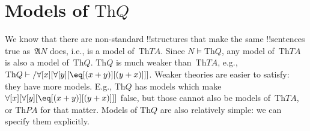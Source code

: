 \documentclass[10pt,a4paper]{article}
\theoremstyle{plain}
\theoremstyle{definition}
\theoremstyle{remark}
\newenvironment{explain}{}{}
\newcommand*{\olfileid}[3]{}
\providecommand{\lforall}{\mathord{\forall}}
\providecommand{\Proves}{\mathrel{\vdash}}
\providecommand{\Struct}{\ensuremath{\mathfrak{A}}}
\providecommand{\Sat}[2]{\ensuremath{#1 \models #2}}
\providecommand{\Th}{\ensuremath{\mathrm{Th}}}
\begin{document}



\olfileid{mod}{mar}{mdq}
\section{Models of $\Th{Q}$}

\begin{explain}
We know that there are non-standard !!{structure}s that make the same
!!{sentence}s true as~$\Struct{N}$ does, i.e., is a model
of~$\Th{TA}$. Since $\Sat{N}{\Th{Q}}$, any model of~$\Th{TA}$ is also
a model of~$\Th{Q}$. $\Th{Q}$ is much weaker than~$\Th{TA}$, e.g.,
$\Th{Q} \Proves/ \lforall[x][\lforall[y][\eq[(x +
      y)][(y+x)]]]$. Weaker theories are easier to satisfy: they have
more models. E.g., $\Th{Q}$ has models which make
$\lforall[x][\lforall[y][\eq[(x + y)][(y+x)]]]$ false, but those
cannot also be models of~$\Th{TA}$, or $\Th{PA}$ for that matter.
Models of $\Th{Q}$ are also relatively simple: we can specify them
explicitly.
\end{explain}
\end{document}
